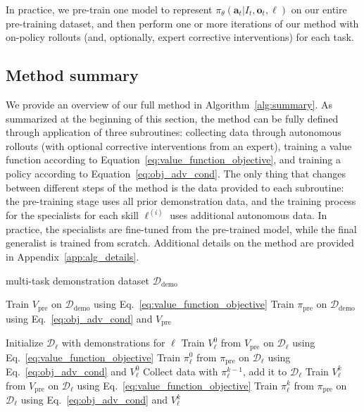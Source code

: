 \documentclass[conference]{IEEEtran}
\newcommand{\ba}{\mathbf{a}}
\newcommand{\bo}{\mathbf{o}}
\newcommand{\lang}{\ell}
\def \MethodFullName {RL with Experience and Corrections via Advantage-conditioned Policies}
\def \MethodName {\textsc{Recap}}
\begin{document}
In practice, we pre-train one model to represent $\pi_\theta(\ba_t | I_t, \bo_t, \lang)$ on our entire pre-training dataset, and then perform one or more iterations of our method with on-policy rollouts (and, optionally, expert corrective interventions) for each task.




\subsection{Method summary}
\label{sec:summary}

We provide an overview of our full method in Algorithm~\ref{alg:summary}. As summarized at the beginning of this section, the method can be fully defined through application of three subroutines: collecting data through autonomous rollouts (with optional corrective interventions from an expert), training a value function according to Equation~\ref{eq:value_function_objective}, and training a policy according to Equation~\ref{eq:obj_adv_cond}. The only thing that changes between different steps of the method is the data provided to each subroutine: the pre-training stage uses all prior demonstration data, and the training process for the specialists for each skill $\lang^{(i)}$ uses additional autonomous data. In practice, the specialists are fine-tuned from the pre-trained model, while the final generalist is trained from scratch. Additional details on the method are provided in Appendix~\ref{app:alg_details}.



\begin{algorithm}[h]
\caption{\MethodFullName{} (\MethodName{})}
\label{alg:summary}
\begin{algorithmic}[1]
\REQUIRE multi-task demonstration dataset $\mathcal{D}_\mathrm{demo}$

\STATE Train $V_\mathrm{pre}$ on $\mathcal{D}_\mathrm{demo}$ using Eq.~\ref{eq:value_function_objective}
\STATE Train $\pi_\mathrm{pre}$ on $\mathcal{D}_\mathrm{demo}$ using Eq.~\ref{eq:obj_adv_cond} and $V_\mathrm{pre}$

\STATE Initialize $\mathcal{D}_{\lang}$ with demonstrations for $\lang$
\STATE Train $V_{\lang}^{0}$ from $V_\mathrm{pre}$ on $\mathcal{D}_{\lang}$ using Eq.~\ref{eq:value_function_objective}
\STATE Train $\pi_{\lang}^{0}$ from $\pi_\mathrm{pre}$ on $\mathcal{D}_{\lang}$ using Eq.~\ref{eq:obj_adv_cond} and $V_{\lang}^{0}$\!\!
    \STATE Collect data with $\pi_{\lang}^{k-1}$, add it to $\mathcal{D}_{\lang}$
    \STATE Train $V_{\lang}^{k}$ from $V_\mathrm{pre}$ on $\mathcal{D}_{\lang}$ using Eq.~\ref{eq:value_function_objective}
    \STATE Train $\pi_{\lang}^{k}$ from $\pi_\mathrm{pre}$ on $\mathcal{D}_{\lang}$ using Eq.~\ref{eq:obj_adv_cond} and $V_{\lang}^{k}$
\ENDFOR

\end{algorithmic}
\end{algorithm}
\end{document}
